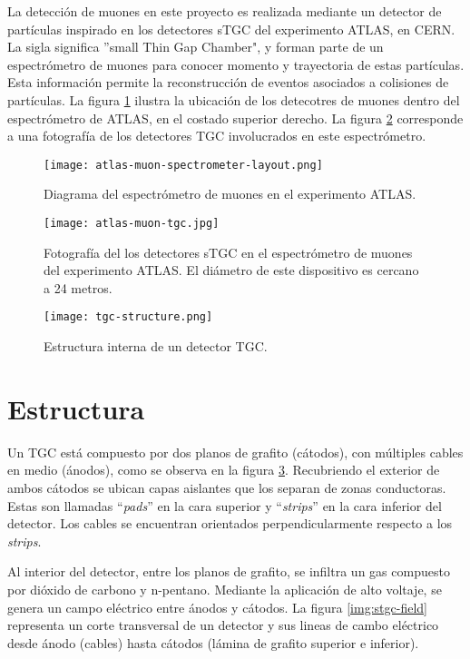 
La detección de muones en este proyecto es realizada mediante un detector de partículas inspirado en los detectores sTGC del experimento ATLAS, en CERN. La sigla significa ''small Thin Gap Chamber", y forman parte de un espectrómetro de muones para conocer momento y trayectoria de estas partículas. Esta información permite la reconstrucción de eventos asociados a colisiones de partículas. La figura \ref{img:atlas-layout} ilustra la ubicación de los detecotres de muones dentro del espectrómetro de ATLAS, en el costado superior derecho. La figura \ref{img:atlas-tgc} corresponde a una fotografía de los detectores TGC involucrados en este espectrómetro.

\begin{figure}[h]
	\centering
	\texttt{[image: atlas-muon-spectrometer-layout.png]}
	\caption{Diagrama del espectrómetro de muones en el experimento ATLAS\cite{AtlasMuonDiagram}.}
	\label{img:atlas-layout}
\end{figure}

\newpage
\begin{figure}[h]
	\centering
	\texttt{[image: atlas-muon-tgc.jpg]}
	\caption{Fotografía del los detectores sTGC en el espectrómetro de muones del experimento ATLAS\cite{AtlasMuonSpect}. El diámetro de este dispositivo es cercano a 24 metros.}
	\label{img:atlas-tgc}
\end{figure}

\begin{figure}[h]
	\centering
	\texttt{[image: tgc-structure.png]}
	\caption{Estructura interna de un detector TGC\cite{Chapman2014}.}
	\label{img:stgc-structure}
\end{figure}

\newpage
\section{Estructura}

	Un TGC está compuesto por dos planos de grafito (cátodos), con múltiples cables en medio (ánodos), como se observa en la figura \ref{img:stgc-structure}. Recubriendo el exterior de ambos cátodos se ubican capas aislantes que los separan de zonas conductoras. Estas son llamadas ``\textit{pads}'' en la cara superior y ``\textit{strips}'' en la cara inferior del detector. Los cables se encuentran orientados perpendicularmente respecto a los \textit{strips}.
	
	Al interior del detector, entre los planos de grafito, se infiltra un gas compuesto por dióxido de carbono y n-pentano. Mediante la aplicación de alto voltaje, se genera un campo eléctrico entre ánodos y cátodos. La figura \ref{img:stgc-field} representa un corte transversal de un detector y sus lineas de cambo eléctrico desde ánodo (cables) hasta cátodos (lámina de grafito superior e inferior).
	

